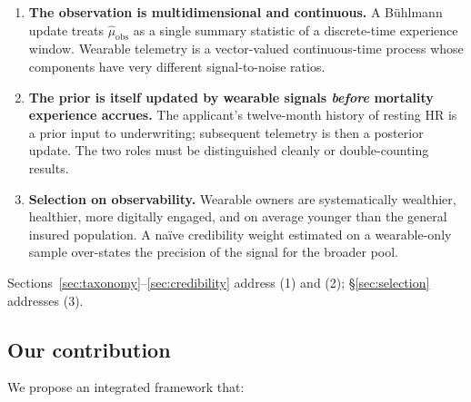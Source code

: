 \begin{enumerate}[leftmargin=*,nosep,topsep=4pt]
   \item \textbf{The observation is multidimensional and continuous.}
         A B\"uhlmann update treats $\hat\mu_{\mathrm{obs}}$ as a single
         summary statistic of a discrete-time experience window.
         Wearable telemetry is a vector-valued continuous-time process
         whose components have very different signal-to-noise ratios.
   \item \textbf{The prior is itself updated by wearable signals
         \emph{before} mortality experience accrues.} The applicant's
         twelve-month history of resting HR is a prior input to
         underwriting; subsequent telemetry is then a posterior update.
         The two roles must be distinguished cleanly or double-counting
         results.
   \item \textbf{Selection on observability.} Wearable owners are
         systematically wealthier, healthier, more digitally engaged,
         and on average younger than the general insured population.
         A na\"ive credibility weight estimated on a wearable-only
         sample over-states the precision of the signal for the
         broader pool.
\end{enumerate}

Sections~\ref{sec:taxonomy}--\ref{sec:credibility} address (1) and (2);
\S\ref{sec:selection} addresses (3).

\subsection{Our contribution}\label{ss:contrib}

We propose an integrated framework that:


